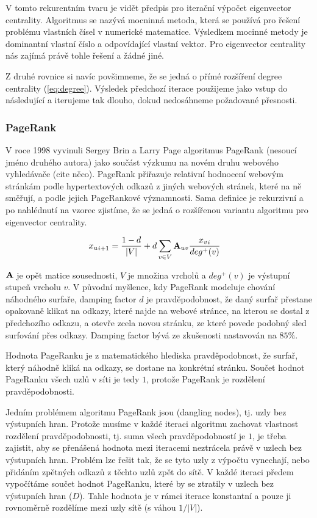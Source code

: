 \documentclass[12pt,titlepage]{report}
\begin{document}
V tomto rekurentním tvaru je vidět předpis pro iterační výpočet eigenvector
centrality. Algoritmus se nazývá mocninná metoda, která se používá pro řešení
problému vlastních čísel v numerické matematice. Výsledkem mocinné metody je
dominantní vlastní číslo a odpovídající vlastní vektor. Pro eigenvector
centrality nás zajímá právě tohle řešení a žádné jiné.

Z druhé rovnice si navíc povšimneme, že se jedná o přímé rozšíření degree
centrality (\ref{eq:degree}). Výsledek předchozí iterace použijeme jako vstup
do následující a iterujeme tak dlouho, dokud nedosáhneme požadované přesnosti.

\subsubsection{PageRank}
V roce 1998 vyvinuli Sergey Brin a Larry Page algoritmus PageRank (nesoucí
jméno druhého autora) jako součást výzkumu na novém druhu webového vyhledávače
(cite něco). PageRank přiřazuje relativní hodnocení webovým stránkám podle
hypertextových odkazů z jiných webových stránek, které na ně směřují, a podle
jejich PageRankové významnosti. Sama definice je rekurzivní a po nahlédnutí na
vzorec zjistíme, že se jedná o rozšířenou variantu algoritmu pro eigenvector
centrality.

\begin{align}
{x_u}_{i + 1} &= \frac{1 - d}{|V|} + d \displaystyle\sum_{v \in V} {\bf A}_{uv}
\frac{{x_v}_{i}}{deg^+ (v)}
\end{align}

${\bf A}$ je opět matice sousednosti, $V$ je množina vrcholů a $deg^+(v)$ je
výstupní stupeň vrcholu $v$.  V původní myšlence, kdy PageRank modeluje chování
náhodného surfaře, damping factor $d$ je pravděpodobnost, že daný surfař
přestane opakovaně klikat na odkazy, které najde na webové stránce, na kterou
se dostal z předchozího odkazu, a otevře zcela novou stránku, ze které povede
podobný sled surfování přes odkazy.  Damping factor bývá ze zkušenosti
nastavován na $85\%$.

Hodnota PageRanku je z matematického hlediska pravděpodobnost, že surfař, který
náhodně kliká na odkazy, se dostane na konkrétní stránku. Součet hodnot
PageRanku všech uzlů v síti je tedy $1$, protože PageRank je rozdělení
pravděpodobnosti.

Jedním problémem algoritmu PageRank jsou  (dangling nodes), tj.
uzly bez výstupních hran. Protože musíme v každé iteraci algoritmu zachovat
vlastnost rozdělení pravděpodobnosti, tj. suma všech pravděpodobností je $1$,
je třeba zajistit, aby se přenášená hodnota mezi iteracemi neztrácela právě v
uzlech bez výstupních hran. Problém lze řešit tak, že se tyto uzly z výpočtu
vynechají, nebo přidáním zpětných odkazů z těchto uzlů zpět do sítě.  V každé
iteraci předem vypočítáme součet hodnot PageRanku, které by se ztratily v
uzlech bez výstupních hran ($D$). Tahle hodnota je v rámci iterace konstantní a
pouze ji rovnoměrně rozdělíme mezi uzly sítě (s váhou $1/|V|$).
\end{document}
